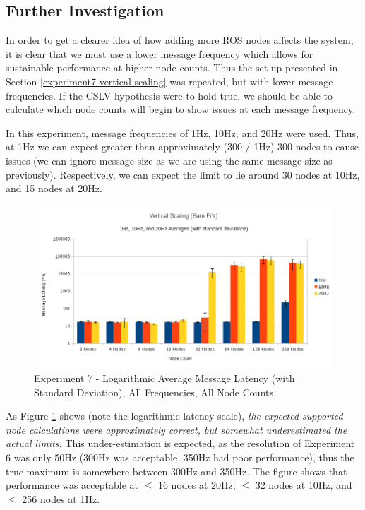 \documentclass[../dissertation.tex]{subfiles}
\begin{document}
\subsection{Further Investigation}
\label{exp-7-further}

In order to get a clearer idea of how adding more ROS nodes affects the system, it is clear that we must use a lower message frequency which allows for sustainable performance at higher node counts. Thus the set-up presented in Section \ref{experiment7-vertical-scaling} was repeated, but with lower message frequencies. If the CSLV hypothesis were to hold true, we should be able to calculate which node counts will begin to show issues at each message frequency.

In this experiment, message frequencies of 1Hz, 10Hz, and 20Hz were used. Thus, at 1Hz we can expect greater than approximately (300 / 1Hz) 300 nodes to cause issues (we can ignore message size as we are using the same message size as previously). Respectively, we can expect the limit to lie around 30 nodes at 10Hz, and 15 nodes at 20Hz.

\begin{figure}[H]
\centering
\includegraphics[width=\textwidth]{images/experiment8/vertical_scaling_all_freqs_log_avg_msg_latency.png}
\caption{Experiment 7 - Logarithmic Average Message Latency (with Standard Deviation), All Frequencies, All Node Counts}
\label{exp7-further-all-freqs-averages}
\end{figure}

As Figure \ref{exp7-further-all-freqs-averages} shows (note the logarithmic latency scale), \textit{the expected supported node calculations were approximately correct, but somewhat underestimated the actual limits.} This under-estimation is expected, as the resolution of Experiment 6 was only 50Hz (300Hz was acceptable, 350Hz had poor performance), thus the true maximum is somewhere between 300Hz and 350Hz. The figure shows that performance was acceptable at $\leq$ 16 nodes at 20Hz, $\leq$ 32 nodes at 10Hz, and $\leq$ 256 nodes at 1Hz.
\end{document}

